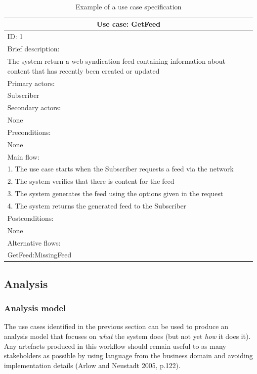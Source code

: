 \documentclass[a4paper]{article}
\begin{document}
\begin{table}[t]
\begin{center}
\begin{tabular}{ | p{\textwidth} |}
\hline
\multicolumn{1}{|c|}{Use case: GetFeed} \\
\hline
ID: 1 \\
\hline
Brief description: \\
The system return a web syndication feed containing information about content that has recently been created or updated \\
\hline
Primary actors: \\
Subscriber \\
\hline
Secondary actors: \\
None \\
\hline
Preconditions: \\
None \\
\hline
Main flow: \\
1. The use case starts when the Subscriber requests a feed via the network \\
2. The system verifies that there is content for the feed \\
3. The system generates the feed using the options given in the request \\
4. The system returns the generated feed to the Subscriber \\
\hline
Postconditions: \\
None \\
\hline
Alternative flows: \\
GetFeed:MissingFeed \\
\hline
\end{tabular}
\end{center}
\caption{Example of a use case specification}
\label{use-case-detail}
\end{table}

\subsection{Analysis}

\subsubsection{Analysis model}

The use cases identified in the previous section can be used to produce an analysis model that focuses on \textit{what} the system does (but not yet \textit{how} it does it). Any artefacts produced in this workflow should remain useful to as many stakeholders as possible by using language from the business domain and avoiding implementation details (Arlow and Neustadt 2005, p.122).
\end{document}
